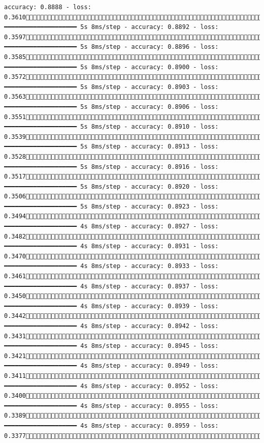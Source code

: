 \documentclass[
  letterpaper,
  DIV=11,
  numbers=noendperiod]{scrreprt}
\begin{document}
\begin{verbatim}
accuracy: 0.8888 - loss: 0.36101178/1875 ━━━━━━━━━━━━━━━━━━━━ 5s 8ms/step - accuracy: 0.8892 - loss: 0.35971185/1875 ━━━━━━━━━━━━━━━━━━━━ 5s 8ms/step - accuracy: 0.8896 - loss: 0.35851193/1875 ━━━━━━━━━━━━━━━━━━━━ 5s 8ms/step - accuracy: 0.8900 - loss: 0.35721199/1875 ━━━━━━━━━━━━━━━━━━━━ 5s 8ms/step - accuracy: 0.8903 - loss: 0.35631206/1875 ━━━━━━━━━━━━━━━━━━━━ 5s 8ms/step - accuracy: 0.8906 - loss: 0.35511214/1875 ━━━━━━━━━━━━━━━━━━━━ 5s 8ms/step - accuracy: 0.8910 - loss: 0.35391221/1875 ━━━━━━━━━━━━━━━━━━━━ 5s 8ms/step - accuracy: 0.8913 - loss: 0.35281228/1875 ━━━━━━━━━━━━━━━━━━━━ 5s 8ms/step - accuracy: 0.8916 - loss: 0.35171235/1875 ━━━━━━━━━━━━━━━━━━━━ 5s 8ms/step - accuracy: 0.8920 - loss: 0.35061243/1875 ━━━━━━━━━━━━━━━━━━━━ 5s 8ms/step - accuracy: 0.8923 - loss: 0.34941251/1875 ━━━━━━━━━━━━━━━━━━━━ 4s 8ms/step - accuracy: 0.8927 - loss: 0.34821259/1875 ━━━━━━━━━━━━━━━━━━━━ 4s 8ms/step - accuracy: 0.8931 - loss: 0.34701265/1875 ━━━━━━━━━━━━━━━━━━━━ 4s 8ms/step - accuracy: 0.8933 - loss: 0.34611272/1875 ━━━━━━━━━━━━━━━━━━━━ 4s 8ms/step - accuracy: 0.8937 - loss: 0.34501278/1875 ━━━━━━━━━━━━━━━━━━━━ 4s 8ms/step - accuracy: 0.8939 - loss: 0.34421285/1875 ━━━━━━━━━━━━━━━━━━━━ 4s 8ms/step - accuracy: 0.8942 - loss: 0.34311292/1875 ━━━━━━━━━━━━━━━━━━━━ 4s 8ms/step - accuracy: 0.8945 - loss: 0.34211299/1875 ━━━━━━━━━━━━━━━━━━━━ 4s 8ms/step - accuracy: 0.8949 - loss: 0.34111307/1875 ━━━━━━━━━━━━━━━━━━━━ 4s 8ms/step - accuracy: 0.8952 - loss: 0.34001315/1875 ━━━━━━━━━━━━━━━━━━━━ 4s 8ms/step - accuracy: 0.8955 - loss: 0.33891323/1875 ━━━━━━━━━━━━━━━━━━━━ 4s 8ms/step - accuracy: 0.8959 - loss: 0.33771330/1875 
\end{verbatim}
\end{document}
